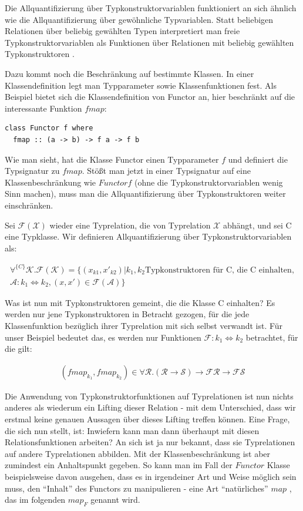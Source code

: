 \documentclass[11pt]{article} %
\begin{document}
Die Allquantifizierung über Typkonstruktorvariablen funktioniert an sich ähnlich wie die Allquantifizierung über gewöhnliche
Typvariablen. Statt beliebigen Relationen über beliebig gewählten Typen interpretiert man freie Typkonstruktorvariablen als
Funktionen über Relationen mit beliebig gewählten Typkonstruktoren \cite{voigtlander}.

Dazu kommt noch die Beschränkung auf bestimmte Klassen. In einer Klassendefinition legt man Typparameter sowie
Klassenfunktionen fest. Als Beispiel bietet sich die Klassendefinition von Functor an, hier beschränkt auf die interessante Funktion
$fmap$:

\begin{verbatim}
class Functor f where
  fmap :: (a -> b) -> f a -> f b
\end{verbatim}

Wie man sieht, hat die Klasse Functor einen Typparameter $f$ und definiert die Typsignatur zu $fmap$. Stößt man jetzt in
einer Typsignatur auf eine Klassenbeschränkung wie $Functor f$ (ohne die Typkonstruktorvariablen wenig Sinn machen),
muss man die Allquantifizierung über Typkonstruktoren weiter einschränken.

Sei $\mathcal{F}(\mathcal{X})$ wieder eine Typrelation, die von Typrelation $\mathcal{X}$ abhängt, und sei C eine Typklasse. Wir definieren Allquantifizierung über Typkonstruktorvariablen als:

\begin{align*}
\forall^{\{C\}} \mathcal{K} . \mathcal{F}(\mathcal{K}) = \{ 
(x_{k1}, x'_{k2}) | k_1, k_2 \text{Typkonstruktoren für C, die C einhalten},\\
\mathcal{A} : k_1 \Leftrightarrow k_2, (x, x') \in \mathcal{F}(\mathcal{A})
\}
\end{align*}

Was ist nun mit Typkonstruktoren gemeint, die die Klasse C einhalten? Es werden nur jene Typkonstruktoren in Betracht gezogen,
für die jede Klassenfunktion bezüglich ihrer Typrelation mit sich selbst verwandt ist. Für unser Beispiel bedeutet das, es werden nur
Funktionen $\mathcal{F} : k_1 \Leftrightarrow k_2$ betrachtet, für die gilt:

\begin{align*}
(fmap_{k_1}, fmap_{k_2}) \in \forall \mathcal{R} . (\mathcal{R} \rightarrow \mathcal{S}) \rightarrow \mathcal{F} \mathcal{R}
\rightarrow \mathcal{F} \mathcal{S}
\end{align*}

Die Anwendung von Typkonstruktorfunktionen auf Typrelationen ist nun nichts anderes als wiederum ein Lifting dieser
Relation - mit dem Unterschied, dass wir erstmal keine genauen Aussagen über dieses Lifting treffen können.
Eine Frage, die sich nun stellt, ist: Inwiefern kann man dann überhaupt mit diesen Relationsfunktionen arbeiten? An sich ist ja nur
bekannt, dass sie Typrelationen auf andere Typrelationen abbilden. Mit der Klassenbeschränkung ist aber zumindest ein
Anhaltspunkt gegeben. So kann man im Fall der $Functor$ Klasse beispielsweise davon ausgehen, dass es in irgendeiner
Art und Weise möglich sein muss, den ``Inhalt'' des Functors zu manipulieren - eine Art ``natürliches'' $map$ 
, das im folgenden $map_F$ genannt wird.
\end{document}
